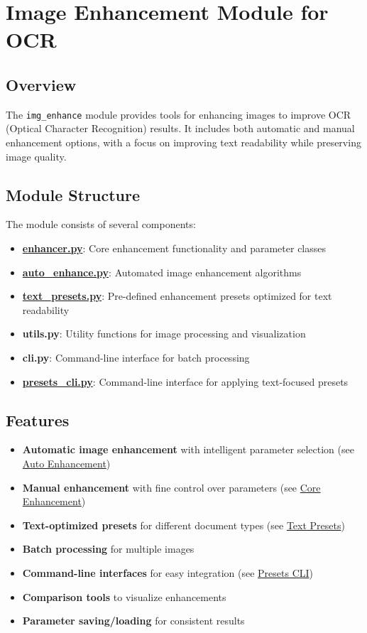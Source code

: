 \section{Image Enhancement Module for OCR}

\subsection{Overview}
The \texttt{img\_enhance} module provides tools for enhancing images to improve OCR (Optical Character Recognition) results. It includes both automatic and manual enhancement options, with a focus on improving text readability while preserving image quality.

\subsection{Module Structure}
The module consists of several components:
\begin{itemize}
    \item \textbf{\hyperref[sec:enhancer]{enhancer.py}}: Core enhancement functionality and parameter classes
    \item \textbf{\hyperref[sec:auto_enhance]{auto\_enhance.py}}: Automated image enhancement algorithms
    \item \textbf{\hyperref[sec:text_presets]{text\_presets.py}}: Pre-defined enhancement presets optimized for text readability
    \item \textbf{utils.py}: Utility functions for image processing and visualization
    \item \textbf{cli.py}: Command-line interface for batch processing
    \item \textbf{\hyperref[sec:presets_cli]{presets\_cli.py}}: Command-line interface for applying text-focused presets
\end{itemize}

\subsection{Features}
\begin{itemize}
    \item \textbf{Automatic image enhancement} with intelligent parameter selection (see \hyperref[sec:auto_enhance]{Auto Enhancement})
    \item \textbf{Manual enhancement} with fine control over parameters (see \hyperref[sec:enhancer]{Core Enhancement})
    \item \textbf{Text-optimized presets} for different document types (see \hyperref[sec:text_presets]{Text Presets})
    \item \textbf{Batch processing} for multiple images
    \item \textbf{Command-line interfaces} for easy integration (see \hyperref[sec:presets_cli]{Presets CLI})
    \item \textbf{Comparison tools} to visualize enhancements
    \item \textbf{Parameter saving/loading} for consistent results
\end{itemize}

